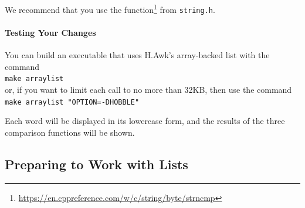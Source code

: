 We recommend that you use the  function\footnote{\url{https://en.cppreference.com/w/c/string/byte/strncmp}} from \texttt{string.h}.

\paragraph{Testing Your Changes}

You can build an executable that uses H.Awk's array-backed list with the command \\
\verb+make arraylist+ \\
or, if you want to limit each  call to no more than 32KB, then use the command \\
\verb+make arraylist "OPTION=-DHOBBLE"+

\begin{description}
\end{description}

Each word will be displayed in its lowercase form, and the results of the three comparison functions will be shown.

\begin{description}
\end{description}


\subsection{Preparing to Work with Lists}

